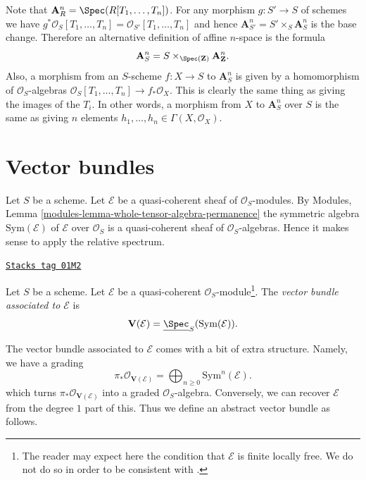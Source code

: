 Note that $\mathbf{A}^n_R = \Spec(R[T_1, \ldots, T_n])$.
For any morphism $g : S' \to S$ of schemes we have
$g^*\mathcal{O}_S[T_1, \ldots, T_n] = \mathcal{O}_{S'}[T_1, \ldots, T_n]$
and hence $\mathbf{A}^n_{S'} = S' \times_S \mathbf{A}^n_S$ is the base
change. Therefore an alternative definition of affine $n$-space
is the formula
$$
\mathbf{A}^n_S = S \times_{\Spec(\mathbf{Z})} \mathbf{A}^n_{\mathbf{Z}}.
$$
Also, a morphism from an $S$-scheme $f : X \to S$
to $\mathbf{A}^n_S$ is given by a homomorphism of
$\mathcal{O}_S$-algebras
$\mathcal{O}_S[T_1, \ldots, T_n] \to f_*\mathcal{O}_X$.
This is clearly the same thing as giving the images of the $T_i$.
In other words, a morphism from $X$ to $\mathbf{A}^n_S$ over $S$
is the same as giving $n$ elements
$h_1, \ldots, h_n \in \Gamma(X, \mathcal{O}_X)$.

\section{Vector bundles}
\label{constructions-section-vector-bundle}
Let $S$ be a scheme.
Let $\mathcal{E}$ be a quasi-coherent sheaf of $\mathcal{O}_S$-modules.
By Modules, Lemma \ref{modules-lemma-whole-tensor-algebra-permanence}
the symmetric algebra $\text{Sym}(\mathcal{E})$ of
$\mathcal{E}$ over $\mathcal{O}_S$
is a quasi-coherent sheaf of $\mathcal{O}_S$-algebras.
Hence it makes sense to apply the relative spectrum.

\begin{definition}
\label{constructions-definition-vector-bundle}
\href{https://stacks.math.columbia.edu/tag/01M2}{\texttt{Stacks tag 01M2}}

Let $S$ be a scheme. Let $\mathcal{E}$ be a quasi-coherent
$\mathcal{O}_S$-module\footnote{The reader may expect here
the condition that $\mathcal{E}$ is finite locally free. We do not
do so in order to be consistent with \cite[II, Definition 1.7.8]{EGA}.}.
The {\it vector bundle associated to $\mathcal{E}$} is
$$
\mathbf{V}(\mathcal{E}) = \underline{\Spec}_S(\text{Sym}(\mathcal{E})).
$$
\end{definition}

The vector bundle associated to $\mathcal{E}$ comes with a bit
of extra structure. Namely, we have a grading
$$
\pi_*\mathcal{O}_{\mathbf{V}(\mathcal{E})} =
\bigoplus\nolimits_{n \geq 0} \text{Sym}^n(\mathcal{E}).
$$
which turns $\pi_*\mathcal{O}_{\mathbf{V}(\mathcal{E})}$
into a graded $\mathcal{O}_S$-algebra. Conversely, we can recover
$\mathcal{E}$ from the degree $1$ part of this.
Thus we define an abstract vector bundle as follows.


